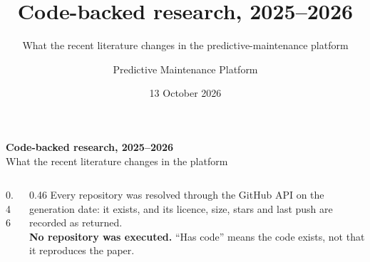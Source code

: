 \documentclass[aspectratio=169,10pt]{beamer}
\title[Code-backed research 2025--2026]{Code-backed research, 2025--2026}
\subtitle{What the recent literature changes in the predictive-maintenance platform}
\author{Predictive Maintenance Platform}
\date{13 October 2026}
\begin{document}
\begin{frame}[plain]
  \vspace{6mm}
  {\LARGE\bfseries Code-backed research, 2025--2026}\\[2mm]
  {\large\color{pdmink2} What the recent literature changes in the platform}\par
  \vspace{5mm}\noindent{\color{pdmrule}\rule{\linewidth}{0.4pt}}\par
  \vspace{3mm}
  \begin{columns}[T]
    \begin{column}{0.46\textwidth}
      \scriptsize
      \\[1mm]
      \\[1mm]
      \\[1mm]
      \\[1mm]
    \end{column}
    \begin{column}{0.46\textwidth}
      \scriptsize\color{pdmink2}
      Every repository was resolved through the GitHub API on the generation
      date: it exists, and its licence, size, stars and last push are recorded
      as returned.\\[2mm]
      \textbf{No repository was executed.} ``Has code'' means the code exists,
      not that it reproduces the paper.
    \end{column}
  \end{columns}
\end{frame}
\end{document}
